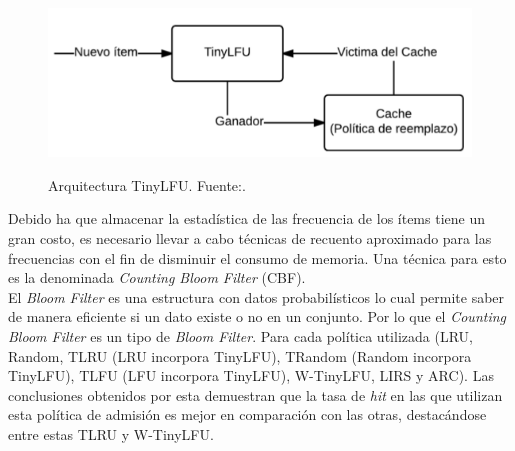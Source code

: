 \documentclass[12pt]{ociamthesis}  %
\begin{document}
\begin{figure}[!htb]
	\centering
	\includegraphics[width=12cm]{Imagenes/Politica_TinyLFU}\\
	\caption{Arquitectura TinyLFU. Fuente:.\cite{einziger2014tinylfu}}
	\label{clasificacion_consulta_cc_uc}
\end{figure}

Debido ha que almacenar la estadística de las frecuencia de los ítems tiene un gran costo, es necesario llevar a cabo técnicas de recuento aproximado para las frecuencias con el fin de disminuir el consumo de memoria. Una técnica para esto es la denominada \textit{Counting Bloom Filter} (CBF).\\

El \textit{Bloom Filter} es una estructura con datos probabilísticos lo cual permite saber de manera eficiente si un dato existe o no en un conjunto. Por lo que el \textit{Counting Bloom Filter} es un tipo de \textit{Bloom Filter}.
Para cada política utilizada (LRU, Random, TLRU (LRU incorpora TinyLFU), TRandom (Random incorpora TinyLFU), TLFU (LFU incorpora TinyLFU), W-TinyLFU, LIRS y ARC). Las conclusiones obtenidos por esta demuestran que la tasa de \textit{hit} en las que utilizan esta política de admisión es mejor en comparación con las otras, destacándose entre estas TLRU y W-TinyLFU.\\







\end{document}
